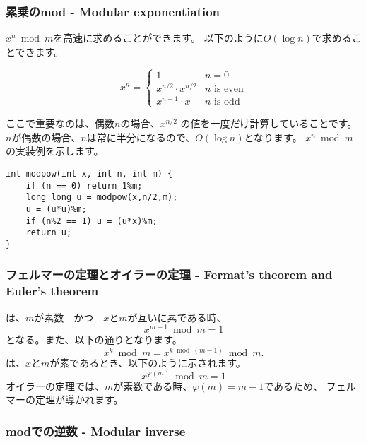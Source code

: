 \subsubsection{累乗のmod - Modular exponentiation}

$x^n \bmod m$を高速に求めることができます。
以下のように$O(\log n)$で求めることできます。

\begin{equation*}
    x^n = \begin{cases}
               1        & n = 0\\
               x^{n/2} \cdot x^{n/2} & \text{$n$ is even}\\
               x^{n-1} \cdot x & \text{$n$ is odd}
           \end{cases}
\end{equation*}

ここで重要なのは、偶数$n$の場合、$x^{n/2}$ の値を一度だけ計算していることです。
$n$が偶数の場合、$n$は常に半分になるので、$O(\log n)$となります。
$x^n \bmod m$の実装例を示します。

\begin{lstlisting}
int modpow(int x, int n, int m) {
    if (n == 0) return 1%m;
    long long u = modpow(x,n/2,m);
    u = (u*u)%m;
    if (n%2 == 1) u = (u*x)%m;
    return u;
}
\end{lstlisting}

\subsubsection{フェルマーの定理とオイラーの定理 - Fermat's theorem and Euler's theorem}


は、$m$が素数　かつ　$x$と$m$が互いに素である時、
\[x^{m-1} \bmod m = 1\]
となる。また、以下の通りとなります。
\[x^k \bmod m = x^{k \bmod (m-1)} \bmod m.\]
は、$x$と$m$が素であるとき、以下のように示されます。
\[x^{\varphi(m)} \bmod m = 1\]
オイラーの定理では、$m$が素数である時、$\varphi(m)=m-1$であるため、
フェルマーの定理が導かれます。

\subsubsection{modでの逆数 - Modular inverse}



